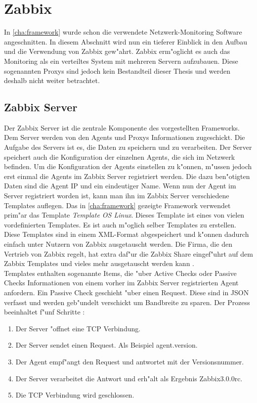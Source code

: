 \chapter{Zabbix}
\label{cha:zabbix}
In \cref{cha:framework} wurde schon die verwendete Netzwerk-Monitoring Software angeschnitten. In diesem Abschnitt wird nun %
ein tieferer Einblick in den Aufbau und die Verwendung von Zabbix gew"ahrt. Zabbix erm"oglicht es %
auch das Monitoring als ein verteiltes System mit mehreren Servern aufzubauen. Diese sogenannten Proxys %
sind jedoch kein Bestandteil dieser Thesis und werden deshalb nicht weiter betrachtet.

\section{Zabbix Server}
\label{sec:server}
Der Zabbix Server ist die zentrale Komponente des vorgestellten Frameworks. Dem Server werden von den Agents und Proxys %
Informationen zugeschickt. Die Aufgabe des Servers ist es, die Daten zu speichern und zu verarbeiten. %
Der Server speichert auch die Konfiguration der einzelnen Agents, die sich im Netzwerk befinden. %
Um die Konfiguration der Agents einstellen zu k"onnen, m"ussen jedoch erst einmal die Agents im Zabbix %
Server registriert werden. Die dazu ben"otigten Daten sind die Agent IP und ein eindeutiger Name. %
Wenn nun der Agent im Server registriert worden ist, kann man ihn im Zabbix Server verschiedene Templates auflegen. %
Das in \cref{cha:framework} gezeigte Framework verwendet prim"ar das Template \emph{Template OS %
Linux}. Dieses Template ist eines von vielen vordefinierten Templates. Es ist auch m"oglich selber Templates %
zu erstellen. Diese Templates sind in einem XML-Format abgespeichert und k"onnen dadurch einfach unter Nutzern von Zabbix %
ausgetauscht werden. Die Firma, die den Vertrieb von Zabbix regelt, hat extra daf"ur die Zabbix Share eingef"uhrt %
auf dem Zabbix Templates und vieles mehr ausgetauscht werden kann \autocite{zabbix:share}. \ \\ %
Templates enthalten sogenannte Items, die "uber Active Checks oder Passive Checks Informationen von %
einem vorher im Zabbix Server registrierten Agent anfordern. Ein Passive Check geschieht "uber einen %
Request. Diese sind in JSON verfasst und werden geb"undelt verschickt um Bandbreite zu sparen. %
Der Prozess beeinhaltet f"unf Schritte \autocite{zabbix:activepassive}: %
\begin{enumerate}
\item Der Server "offnet eine TCP Verbindung. %
\item Der Server sendet einen Request. Als Beispiel agent.version. %
\item Der Agent empf"angt den Request und antwortet mit der Versionsnummer. %
\item Der Server verarbeitet die Antwort und erh"alt als Ergebnis Zabbix3.0.0rc. %
\item Die TCP Verbindung wird geschlossen. %
\end{enumerate}
